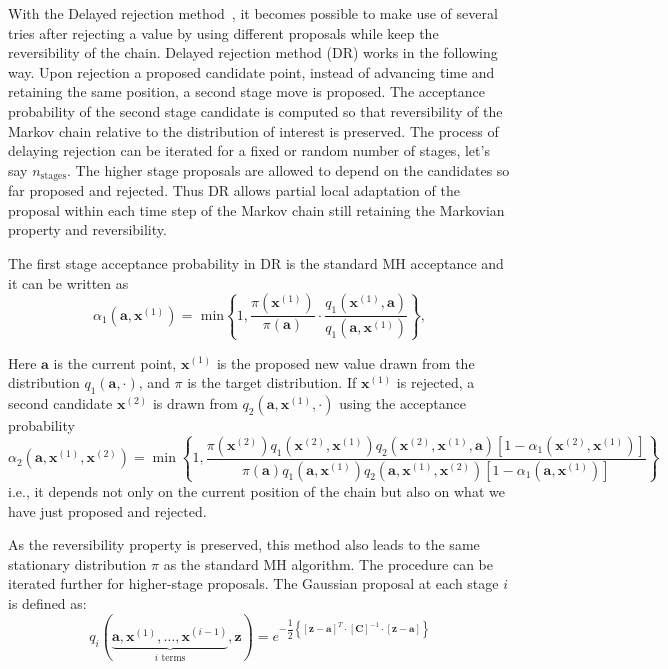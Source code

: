 With the Delayed rejection method~\cite{Mira01}, it becomes possible to make
use of several tries after rejecting a value by using different proposals while
keep the reversibility of the chain. Delayed rejection method (DR) works in the
following way. Upon rejection a proposed candidate point, instead of advancing
time and retaining the same position, a second stage move is proposed. The
acceptance probability of the second stage candidate is computed so that
reversibility of the Markov chain relative to the distribution of interest is
preserved. The process of delaying rejection can be iterated for a fixed or
random number of stages, let's say $n_\text{stages}$. The higher stage
proposals are allowed to depend on the candidates so far proposed and rejected.
Thus DR allows partial local adaptation of the proposal within each time step
of the Markov chain still retaining the Markovian property and reversibility.

The first stage acceptance probability in DR is the standard MH acceptance and
it can be written as
\begin{equation*}
\alpha_1(\mathbf{a},\mathbf{x}^{(1)}) = \text{ min}
\left\{ 1,
\frac{\pi(\mathbf{x}^{(1)})}{\pi(\mathbf{a})} \cdot
\frac{q_1(\mathbf{x}^{(1)},\mathbf{a})}{q_1(\mathbf{a},\mathbf{x}^{(1)})}
\right\},
\end{equation*}

Here $\mathbf{a}$ is the current point, $\mathbf{x}^{(1)}$ is the proposed new
value drawn from the distribution $q_1(\mathbf{a}, \cdot)$, and $\pi$ is the
target distribution.  If $\mathbf{x}^{(1)}$ is rejected, a second candidate
$\mathbf{x}^{(2)}$ is drawn from $q_2(\mathbf{a}, \mathbf{x}^{(1)} , \cdot)$
using the acceptance probability
\begin{equation*}
\alpha_2( \mathbf{a}, \mathbf{x}^{(1)}, \mathbf{x}^{(2)}) =\min \left\{1,
\dfrac{\pi( \mathbf{x}^{(2)}) q_1( \mathbf{x}^{(2)}, \mathbf{x}^{(1)}) q_2( \mathbf{x}^{(2)}, \mathbf{x}^{(1)}, \mathbf{a})[1 - \alpha_1( \mathbf{x}^{(2)} , \mathbf{x}^{(1)} )]}{\pi( \mathbf{a}) q_1( \mathbf{a}, \mathbf{x}^{(1)}) q_2( \mathbf{a}, \mathbf{x}^{(1)}, \mathbf{x}^{(2)})[1 - \alpha_1 ( \mathbf{a}, \mathbf{x}^{(1)} )]}
\right\}
\end{equation*}
%
i.e., it depends not only on the current position of the chain but also on what
we have just proposed and rejected.

As the reversibility property is preserved, this method also leads to the same
stationary distribution $\pi$ as the standard MH algorithm. The procedure can
be iterated further for higher-stage proposals. 
%
The Gaussian proposal at each stage $i$ is defined as:
\begin{equation} %
\label{eq:qi}
q_i(\underbrace{\mathbf{a},\mathbf{x}^{(1)},\ldots,\mathbf{x}^{(i-1)}}_{i\text{ terms}},\mathbf{z})
=
e^{-\dfrac{1}{2}{\displaystyle \left\{[\mathbf{z}-\mathbf{a}]^T\cdot \left[\mathbf{C}\right]^{-1}\cdot[\mathbf{z}-\mathbf{a}]\right\}}} 
\end{equation}

